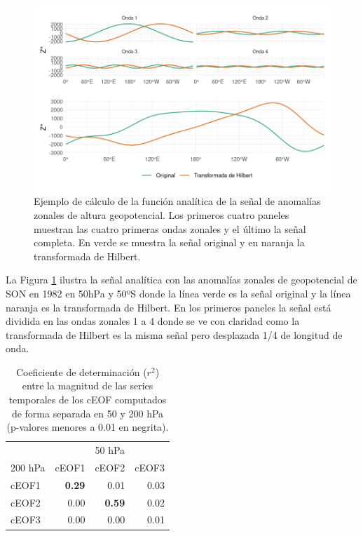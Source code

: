 \documentclass[12pt,oneside,a4paper]{reedthesis}
\begin{document}
\begin{figure}

{\centering \includegraphics{figures/20-ceofs/hilbert-ejemplo-1} 

}

\caption{Ejemplo de cálculo de la función analítica de la señal de anomalías zonales de altura geopotencial. Los primeros cuatro paneles muestran las cuatro primeras ondas zonales y el último la señal completa. En verde se muestra la señal original y en naranja la transformada de Hilbert.}\label{fig:hilbert-ejemplo}
\end{figure}

La Figura \ref{fig:hilbert-ejemplo} ilustra la señal analítica con las anomalías zonales de geopotencial de SON en 1982 en 50hPa y 50ºS donde la línea verde es la señal original y la línea naranja es la transformada de Hilbert.
En los primeros paneles la señal está dividida en las ondas zonales 1 a 4 donde se ve con claridad como la transformada de Hilbert es la misma señal pero desplazada 1/4 de longitud de onda.



\begin{table}

\caption{\label{tab:corr-ceof-splitted}Coeficiente de determinación (\(r^2\)) entre la magnitud de las series temporales de los cEOF computados de forma separada en 50 y 200 hPa (p-valores menores a 0.01 en negrita).}
\centering
\begin{tabular}[t]{l>{}r>{}r>{}r}
\toprule
\multicolumn{1}{c}{} & \multicolumn{3}{c}{50 hPa} \\
\cmidrule(l{3pt}r{3pt}){2-4}
200 hPa & cEOF1 & cEOF2 & cEOF3\\
\midrule
cEOF1 & \textbf{0.29} & 0.01 & 0.03\\
cEOF2 & 0.00 & \textbf{0.59} & 0.02\\
cEOF3 & 0.00 & 0.00 & 0.01\\
\bottomrule
\end{tabular}
\end{table}
\end{document}
